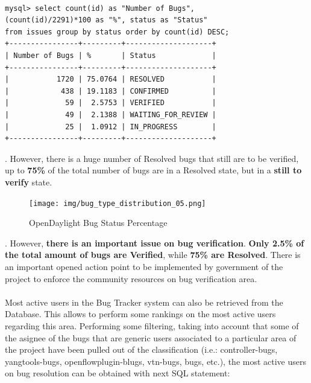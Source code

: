 \documentclass[a4paper, 12pt]{book}
\begin{document}
{\begin{verbatim}

mysql> select count(id) as "Number of Bugs",
(count(id)/2291)*100 as "%", status as "Status"
from issues group by status order by count(id) DESC;
+----------------+---------+--------------------+
| Number of Bugs | %       | Status             |
+----------------+---------+--------------------+
|           1720 | 75.0764 | RESOLVED           |
|            438 | 19.1183 | CONFIRMED          |
|             59 |  2.5753 | VERIFIED           |
|             49 |  2.1388 | WAITING_FOR_REVIEW |
|             25 |  1.0912 | IN_PROGRESS        |
+----------------+---------+--------------------+

\end{verbatim}
. However, there is a huge number of Resolved bugs that still are to be verified, up to \textbf{75\%} of the total number of bugs are in a Resolved state, but in a \textbf{still to verify} state.
\begin{center}
 \begin{figure}[H]
 \begin{center}
   \texttt{[image: img/bug\_type\_distribution\_05.png]}
   \caption{OpenDaylight Bug Status Percentage}
   \label{fig:odl_onion_model}
 \end{center}
 \end{figure}
\end{center}
. However, \textbf{there is an important issue on bug verification}. \textbf{Only 2.5\% of the total amount of bugs are Verified}, while \textbf{75\% are Resolved}. There is an important opened action point to be implemented by government of the project to enforce the community resources on bug verification area.\\
\\
Most active users in the Bug Tracker system can also be retrieved from the Database. This allows to perform some rankings on the most active users regarding this area. Performing some filtering, taking into account that some of the asignee of the bugs that are generic users associated to a particular area of the project have been pulled out of the classification (i.e.: controller-bugs, yangtools-bugs, openflowplugin-blugs, vtn-bugs, bugs, etc.), the most active users on bug resolution can be obtained with next SQL statement:

}
\end{document}
